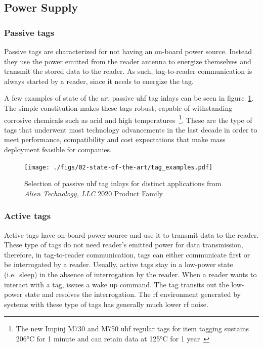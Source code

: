 \subsection{Power Supply}

\subsubsection{Passive tags}

Passive tags are characterized for not having an on-board power source. 
Instead they use the power emitted from the reader antenna to energize themselves and transmit the stored data to the reader.
As such, tag-to-reader communication is always started by a reader, since it needs to energize the tag.

A few examples of state of the art passive \ac{uhf} tag inlays can be seen in figure~\ref{fig:alienAlienProductFamily2020}.
The simple constitution makes these tags robust, capable of withstanding corrosive chemicals such as acid and high temperatures~\footnote{The new Impinj M730 and M750 \ac{uhf} regular tags for item tagging sustains \ang{206}C for 1 minute and can retain data at \ang{125}C for 1 year~\cite[Tab. 18]{ImpinjM730M750}}.
These are the type of tags that underwent most technology advancements in the last decade in order to meet performance, compatibility and cost expectations that make mass deployment feasible for companies.

\begin{figure}[!ht]
    \centering
    \texttt{[image: ./figs/02-state-of-the-art/tag\_examples.pdf]}
    \caption[Selection of passive \ac{uhf} tag inlays for distinct applications from \textit{Alien Technology, LLC} 2020 Product Family]{Selection of passive \ac{uhf} tag inlays for distinct applications from \textit{Alien Technology, LLC} 2020 Product Family~\cite{alienAlienProductFamily2020}} 
    \label{fig:alienAlienProductFamily2020}
\end{figure}

\subsubsection{Active tags}

Active tags have on-board power source and use it to transmit data to the reader.
These type of tags do not need reader's emitted power for data transmission, therefore, in tag-to-reader communication, tags can either communicate first or be interrogated by a reader.
Usually, active tags stay in a low-power state (i.e.\ sleep) in the absence of interrogation by the reader. When a reader wants to interact with a tag, issues a wake up command. The tag transits out the low-power state and resolves the interrogation.
The \ac{rf} environment generated by systems with these type of tags has generally much lower \ac{rf} noise.

